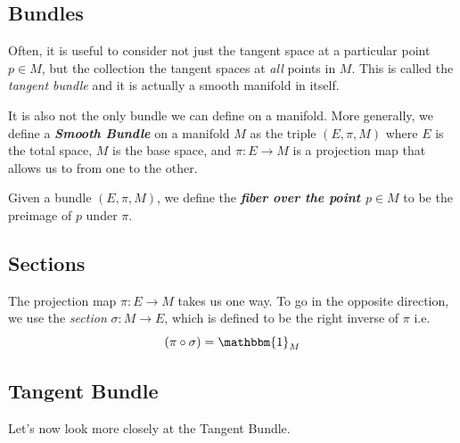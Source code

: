 \documentclass{article}
\begin{document}
\vskip 1cm
\subsection{Bundles}
Often, it is useful to consider not just the tangent space at a particular point $p \in M$, but the collection the tangent spaces at \emph{all} points in $M$. This is called the \emph{tangent bundle} and it is actually a smooth manifold in itself.

\vskip 0.5cm 
It is also not the only bundle we can define on a manifold. More generally, we define a \emph{\textbf{Smooth Bundle}} on a manifold $M$ as the triple $(E, \pi, M)$ where $E$ is the total space, $M$ is the base space, and $\pi : E \rightarrow M$ is a projection map that allows us to from one to the other.

\vskip 0.5cm
Given a bundle $(E, \pi, M)$, we define the \emph{\textbf{fiber over the point $p \in M$}} to be the preimage of $p$ under $\pi$.

\vskip 1cm
\subsection{Sections}
The projection map $\pi : E \rightarrow M$ takes us one way. To go in the opposite direction, we use the \emph{section} $\sigma : M \rightarrow E$, which is defined to be the right inverse of $\pi$ i.e.
\[  \left(\pi \circ \sigma \right) = \mathbbm{1}_M  \]


\vskip 1cm
\subsection{Tangent Bundle}

Let's now look more closely at the Tangent Bundle.
\end{document}
